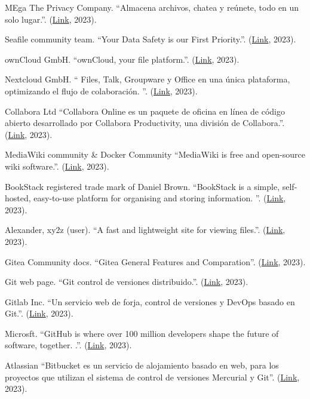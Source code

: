 \documentclass[spanish,final]{setup/eetac_tfc_pfc}
\begin{document}
\begin{thebibliography}{2}
MEga The Privacy Company.
``Almacena archivos, chatea y reúnete, todo en un solo lugar.''.
(\href{https://mega.io/}{Link}, 2023).

Seafile community team.
``Your Data Safety is our First Priority.''.
(\href{www.seafile.com}{Link}, 2023).

 ownCloud GmbH.
``ownCloud, your file platform.''.
(\href{https://owncloud.com/}{Link}, 2023).

Nextcloud GmbH.
`` Files, Talk, Groupware y Office en una única plataforma, optimizando el flujo de colaboración. ''.
(\href{https://nextcloud.com/es/}{Link}, 2023).

Collabora Ltd
``Collabora Online es un paquete de oficina en línea de código abierto desarrollado por Collabora Productivity, una división de Collabora.''.
(\href{https://www.collaboraoffice.com/collabora-online/}{Link}, 2023).

MediaWiki community \& Docker Community
``MediaWiki is free and open-source wiki software.''.
(\href{https://hub.docker.com/_/mediawiki}{Link}, 2023).

BookStack registered trade mark of Daniel Brown.
``BookStack is a simple, self-hosted, easy-to-use platform for organising and storing information. ''.
(\href{https://www.bookstackapp.com/}{Link}, 2023).

Alexander, xy2z (user).
``A fast and lightweight site for viewing files.''.
(\href{https://github.com/xy2z/PineDocs}{Link}, 2023).

Gitea Community docs.
``Gitea General Features and Comparation''.
(\href{https://docs.gitea.com/next/installation/comparison##general-features}{Link}, 2023).

Git web page.
``Git control de versiones distribuido.''.
(\href{https://git-scm.com/}{Link}, 2023).

Gitlab Inc. 
``Un servicio web de forja, control de versiones y DevOps basado en Git.''.
(\href{https://about.gitlab.com/}{Link}, 2023).

Microsft. 
``GitHub is where over 100 million developers shape the future of software, together. .''.
(\href{https://github.com/}{Link}, 2023).

Atlassian
``Bitbucket es un servicio de alojamiento basado en web, para los proyectos que utilizan el sistema de control de versiones Mercurial y Git''.
(\href{https://bitbucket.org/}{Link}, 2023).


\end{thebibliography}
\end{document}
